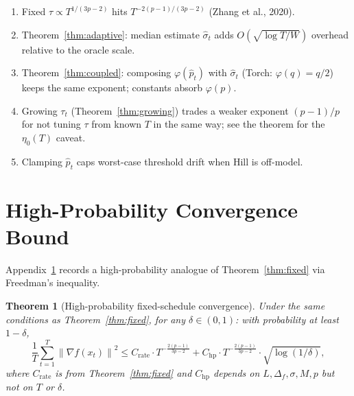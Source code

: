 \documentclass[11pt]{article}
\newtheorem{theorem}{Theorem}
\theoremstyle{definition}
\newcommand{\norm}[1]{\left\| #1 \right\|}
\newcommand{\phat}{\hat{p}}
\newcommand{\shat}{\hat{\sigma}}
\begin{document}
\begin{enumerate}
  \item Fixed $\tau \propto T^{1/(3p-2)}$ hits $T^{-2(p-1)/(3p-2)}$
    \textup{(}Zhang et al., 2020\textup{)}.
  \item Theorem~\ref{thm:adaptive}: median estimate $\shat_t$ adds
    $O(\sqrt{\log T/W})$ overhead relative to the oracle scale.
  \item Theorem~\ref{thm:coupled}: composing $\varphi(\phat_t)$ with $\shat_t$
    \textup{(}Torch: $\varphi(q)=q/2$\textup{)} keeps the same exponent;
    constants absorb $\varphi(p)$.
  \item Growing $\tau_t$ \textup{(}Theorem~\ref{thm:growing}\textup{)} trades a
    weaker exponent $(p-1)/p$ for not tuning $\tau$ from known $T$ in the same
    way; see the theorem for the $\eta_0(T)$ caveat.
  \item Clamping $\phat_t$ caps worst-case threshold drift when Hill is off-model.
\end{enumerate}


\appendix
\section{High-Probability Convergence Bound}
\label{sec:highprob}

Appendix~\ref{sec:highprob} records a high-probability analogue of
Theorem~\ref{thm:fixed} via Freedman's inequality.

\begin{theorem}[High-probability fixed-schedule convergence]\label{thm:highprob}
Under the same conditions as Theorem~\ref{thm:fixed}, for any $\delta \in (0,1)$:
with probability at least $1 - \delta$,
\begin{equation}\label{eq:highprob_rate}
  \frac{1}{T}\sum_{t=1}^T \norm{\nabla f(x_t)}^2
  \leq C_{\mathrm{rate}} \cdot T^{-\frac{2(p-1)}{3p-2}}
  + C_{\mathrm{hp}} \cdot T^{-\frac{2(p-1)}{3p-2}} \cdot \sqrt{\log(1/\delta)},
\end{equation}
where $C_{\mathrm{rate}}$ is from Theorem~\ref{thm:fixed} and $C_{\mathrm{hp}}$
depends on $L, \Delta_f, \sigma, M, p$ but not on $T$ or $\delta$.
\end{theorem}
\end{document}
